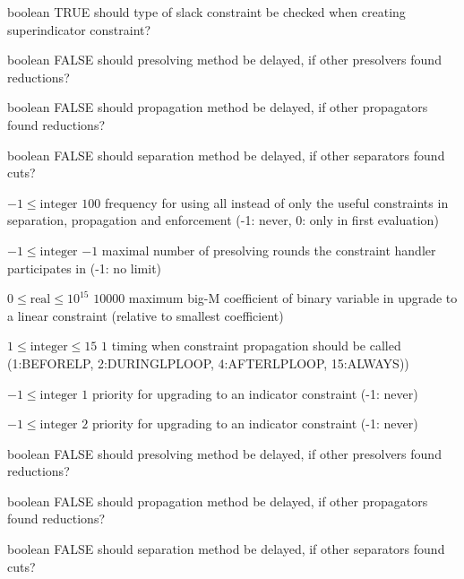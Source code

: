 %
{boolean}%
{TRUE}%
{should type of slack constraint be checked when creating superindicator constraint?}%
{}

%
{boolean}%
{FALSE}%
{should presolving method be delayed, if other presolvers found reductions?}%
{}

%
{boolean}%
{FALSE}%
{should propagation method be delayed, if other propagators found reductions?}%
{}

%
{boolean}%
{FALSE}%
{should separation method be delayed, if other separators found cuts?}%
{}

%
{$-1\leq\textrm{integer}$}%
{$100$}%
{frequency for using all instead of only the useful constraints in separation, propagation and enforcement (-1: never, 0: only in first evaluation)}%
{}

%
{$-1\leq\textrm{integer}$}%
{$-1$}%
{maximal number of presolving rounds the constraint handler participates in (-1: no limit)}%
{}

%
{$0\leq\textrm{real}\leq10^{ 15}$}%
{$10000$}%
{maximum big-M coefficient of binary variable in upgrade to a linear constraint (relative to smallest coefficient)}%
{}

%
{$1\leq\textrm{integer}\leq15$}%
{$1$}%
{timing when constraint propagation should be called (1:BEFORELP, 2:DURINGLPLOOP, 4:AFTERLPLOOP, 15:ALWAYS))}%
{}

%
{$-1\leq\textrm{integer}$}%
{$1$}%
{priority for upgrading to an indicator constraint (-1: never)}%
{}

%
{$-1\leq\textrm{integer}$}%
{$2$}%
{priority for upgrading to an indicator constraint (-1: never)}%
{}

%
{boolean}%
{FALSE}%
{should presolving method be delayed, if other presolvers found reductions?}%
{}

%
{boolean}%
{FALSE}%
{should propagation method be delayed, if other propagators found reductions?}%
{}

%
{boolean}%
{FALSE}%
{should separation method be delayed, if other separators found cuts?}%
{}

